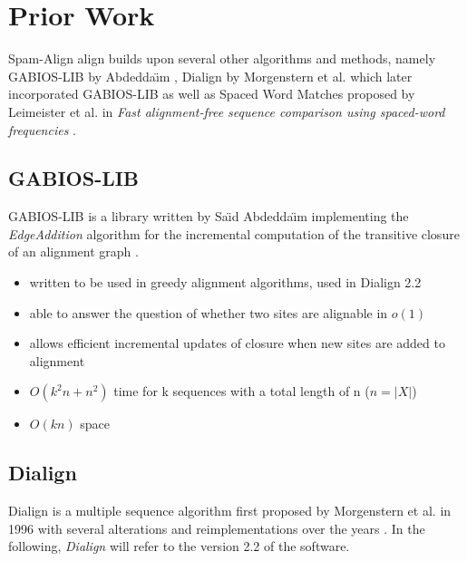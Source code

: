 \chapter{Prior Work}
Spam-Align align builds upon several other algorithms and methods, namely GABIOS-LIB by Abdedda{\"\i}m \cite{abdeddaim1997incremental}, Dialign by Morgenstern et al. \cite{morgenstern1996multiple} which later incorporated GABIOS-LIB \cite{abdeddaim2000speeding} as well as Spaced Word Matches proposed by Leimeister et al. in \textit{Fast alignment-free sequence comparison using spaced-word frequencies} \cite{leimeister2014fast}.

\section{GABIOS-LIB}

GABIOS-LIB is a library written by Sa{\"\i}d Abdedda{\"\i}m implementing the \textit{EdgeAddition} algorithm for the incremental computation of the transitive closure of an alignment graph \cite{abdeddaim1997incremental}. 

\begin{itemize}
	\item written to be used in greedy alignment algorithms, used in Dialign 2.2
	\item able to answer the question of whether two sites are alignable in $o(1)$
	\item allows efficient incremental updates of closure when new sites are added to alignment 
	\item $O(k^2n+n^2)$ time for k sequences with a total length of n ($n = |X|$)
	\item $O(kn)$ space
\end{itemize}
 

\section{Dialign}
Dialign is a multiple sequence algorithm first proposed by Morgenstern et al. in 1996 \cite{morgenstern1996multiple} with several alterations and reimplementations over the years  \cite{abdeddaim2000speeding, morgenstern1999dialign, sub:wey:kau:mor:05, sub:kau:mor:08, morgenstern2004dialign}. In the following, \textit{Dialign} will refer to the version 2.2 \cite{morgenstern2004dialign} of the software.\\


